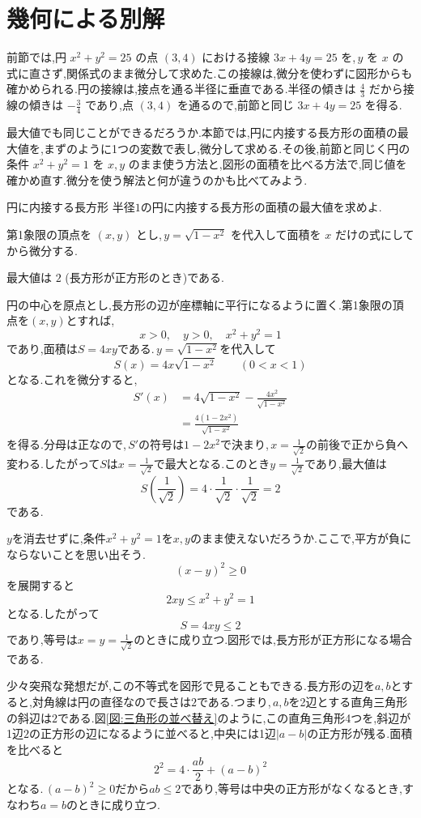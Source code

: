 \section{幾何による別解}\label{節:幾何による別解}
前節では,円 $x^2+y^2=25$ の点 $(3,4)$ における接線 $3x+4y=25$ を,\,$y$ を $x$ の式に直さず,関係式のまま微分して求めた.この接線は,微分を使わずに図形からも確かめられる.円の接線は,接点を通る半径に垂直である.半径の傾きは $\frac43$ だから接線の傾きは $-\frac34$ であり,点 $(3,4)$ を通るので,前節と同じ $3x+4y=25$ を得る.

最大値でも同じことができるだろうか.本節では,円に内接する長方形の面積の最大値を,まずのように1つの変数で表し,微分して求める.その後,前節と同じく円の条件 $x^2+y^2=1$ を $x,y$ のまま使う方法と,図形の面積を比べる方法で,同じ値を確かめ直す.微分を使う解法と何が違うのかも比べてみよう.

\begin{example}{円に内接する長方形}
半径$1$の円に内接する長方形の面積の最大値を求めよ.
\end{example}
第1象限の頂点を $(x,y)$ とし,\,$y=\sqrt{1-x^2}$ を代入して面積を $x$ だけの式にしてから微分する.

最大値は $2$ (長方形が正方形のとき)である.

円の中心を原点とし,長方形の辺が座標軸に平行になるように置く.第1象限の頂点を$(x,y)$とすれば,
\[
 x>0,\quad y>0,\quad x^2+y^2=1
\]
であり,面積は$S=4xy$である.\,$y=\sqrt{1-x^2}$を代入して
\[
 S(x)=4x\sqrt{1-x^2}\qquad(0<x<1)
\]
となる.これを微分すると,
\begin{align*}
 S'(x)&=4\sqrt{1-x^2}-\frac{4x^2}{\sqrt{1-x^2}}\\
 &=\frac{4(1-2x^2)}{\sqrt{1-x^2}}
\end{align*}
を得る.分母は正なので,\,$S'$の符号は$1-2x^2$で決まり,\,$x=\frac1{\sqrt2}$の前後で正から負へ変わる.したがって$S$は$x=\frac1{\sqrt2}$で最大となる.このとき$y=\frac1{\sqrt2}$であり,最大値は
\[
 S\left(\frac1{\sqrt2}\right)=4\cdot\frac1{\sqrt2}\cdot\frac1{\sqrt2}=2
\]
である.

$y$を消去せずに,条件$x^2+y^2=1$を$x,y$のまま使えないだろうか.ここで,平方が負にならないことを思い出そう.
\[
 (x-y)^2\ge0
\]
を展開すると
\[
 2xy\le x^2+y^2=1
\]
となる.したがって
\[
 S=4xy\le2
\]
であり,等号は$x=y=\frac1{\sqrt2}$のときに成り立つ.図形では,長方形が正方形になる場合である.

少々突飛な発想だが,この不等式を図形で見ることもできる.長方形の辺を$a,b$とすると,対角線は円の直径なので長さは$2$である.つまり,\,$a,b$を2辺とする直角三角形の斜辺は$2$である.図\ref{図:三角形の並べ替え}のように,この直角三角形4つを,斜辺が1辺$2$の正方形の辺になるように並べると,中央には1辺$|a-b|$の正方形が残る.面積を比べると
\[
 2^2=4\cdot\frac{ab}{2}+(a-b)^2
\]
となる.\,$(a-b)^2\ge0$だから$ab\le2$であり,等号は中央の正方形がなくなるとき,すなわち$a=b$のときに成り立つ.

